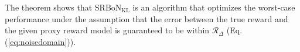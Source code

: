 

The theorem shows that $\mathrm{SRBoN}_{\mathrm{KL}}$ is an algorithm that optimizes the worst-case performance under the assumption that the error between the true reward and the given proxy reward model is guaranteed to be within $\mathcal{R}_{\Delta}$ (Eq. (\ref{eq:noisedomain})). 

